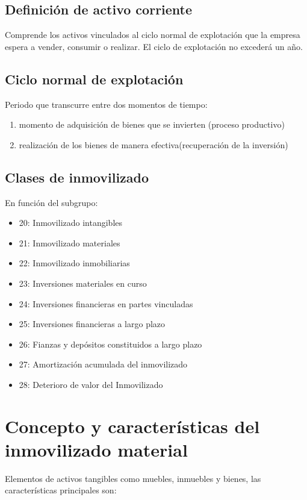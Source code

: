 \documentclass[a4paper,12pt]{article}
\begin{document}
\subsection{Definición de activo corriente}
Comprende los activos vinculados al ciclo normal de explotación que la empresa espera a vender, consumir o realizar. El ciclo de explotación no excederá un año.

\subsection{Ciclo normal de explotación}
Periodo que transcurre entre dos momentos de tiempo: 
\begin{enumerate}
    \item momento de adquisición de bienes que se invierten (proceso productivo)
    \item realización de los bienes de manera efectiva(recuperación de la inversión)
\end{enumerate}

\subsection{Clases de inmovilizado}

En función del subgrupo:
\begin{itemize}
    \item 20: Inmovilizado intangibles
    \item 21: Inmovilizado materiales
    \item 22: Inmovilizado inmobiliarias
    \item 23: Inversiones materiales en curso
    \item 24: Inversiones financieras en partes vinculadas
    \item 25: Inversiones financieras a largo plazo
    \item 26: Fianzas y depósitos constituidos a largo plazo
    \item 27: Amortización acumulada del inmovilizado
    \item 28: Deterioro de valor del Inmovilizado
\end{itemize}

\section{Concepto y características del inmovilizado material}
Elementos de activos tangibles como muebles, inmuebles y bienes, las características principales son:
\end{document}
